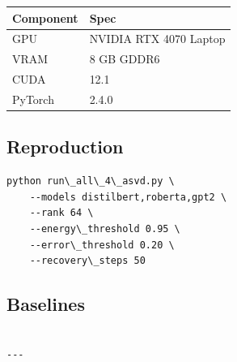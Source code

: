 \begin{table}[H]
\centering
\small
\begin{tabular}{ll}
\toprule
\textbf{Component} & \textbf{Spec} \\
\midrule
GPU & NVIDIA RTX 4070 Laptop \\
VRAM & 8 GB GDDR6 \\
CUDA & 12.1 \\
PyTorch & 2.4.0 \\
\bottomrule
\end{tabular}
\end{table}

\subsection{Reproduction}

\begin{lstlisting}
python run\_all\_4\_asvd.py \
    --models distilbert,roberta,gpt2 \
    --rank 64 \
    --energy\_threshold 0.95 \
    --error\_threshold 0.20 \
    --recovery\_steps 50
\end{lstlisting}

\subsection{Baselines}

\begin{lstlisting}

---
\end{lstlisting}